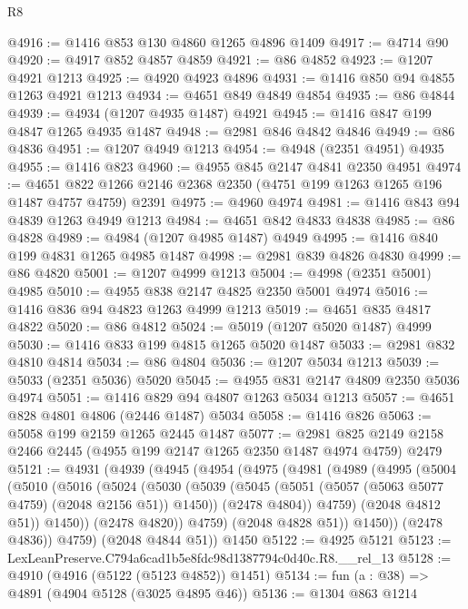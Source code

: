 \begin{lexlean}{R8}
\begin{coremodule}
@4916 := @1416 @853 @130 @4860 @1265 @4896 @1409
@4917 := @4714 @90
@4920 := @4917 @852 @4857 @4859
@4921 := @86 @4852
@4923 := @1207 @4921 @1213
@4925 := @4920 @4923 @4896
@4931 := @1416 @850 @94 @4855 @1263 @4921 @1213
@4934 := @4651 @849 @4849 @4854
@4935 := @86 @4844
@4939 := @4934 (@1207 @4935 @1487) @4921
@4945 := @1416 @847 @199 @4847 @1265 @4935 @1487
@4948 := @2981 @846 @4842 @4846
@4949 := @86 @4836
@4951 := @1207 @4949 @1213
@4954 := @4948 (@2351 @4951) @4935
@4955 := @1416 @823
@4960 := @4955 @845 @2147 @4841 @2350 @4951
@4974 := @4651 @822 @1266 @2146 @2368 @2350 (@4751 @199 @1263 @1265 @196 @1487 @4757 @4759) @2391
@4975 := @4960 @4974
@4981 := @1416 @843 @94 @4839 @1263 @4949 @1213
@4984 := @4651 @842 @4833 @4838
@4985 := @86 @4828
@4989 := @4984 (@1207 @4985 @1487) @4949
@4995 := @1416 @840 @199 @4831 @1265 @4985 @1487
@4998 := @2981 @839 @4826 @4830
@4999 := @86 @4820
@5001 := @1207 @4999 @1213
@5004 := @4998 (@2351 @5001) @4985
@5010 := @4955 @838 @2147 @4825 @2350 @5001 @4974
@5016 := @1416 @836 @94 @4823 @1263 @4999 @1213
@5019 := @4651 @835 @4817 @4822
@5020 := @86 @4812
@5024 := @5019 (@1207 @5020 @1487) @4999
@5030 := @1416 @833 @199 @4815 @1265 @5020 @1487
@5033 := @2981 @832 @4810 @4814
@5034 := @86 @4804
@5036 := @1207 @5034 @1213
@5039 := @5033 (@2351 @5036) @5020
@5045 := @4955 @831 @2147 @4809 @2350 @5036 @4974
@5051 := @1416 @829 @94 @4807 @1263 @5034 @1213
@5057 := @4651 @828 @4801 @4806 (@2446 @1487) @5034
@5058 := @1416 @826
@5063 := @5058 @199 @2159 @1265 @2445 @1487
@5077 := @2981 @825 @2149 @2158 @2466 @2445 (@4955 @199 @2147 @1265 @2350 @1487 @4974 @4759) @2479
@5121 := @4931
    (@4939
      (@4945
        (@4954
          (@4975
            (@4981
              (@4989
                (@4995
                  (@5004
                    (@5010
                      (@5016
                        (@5024
                          (@5030
                            (@5039
                              (@5045 (@5051 (@5057 (@5063 @5077 @4759) (@2048 @2156 @51)) @1450))
                              (@2478 @4804))
                            @4759)
                          (@2048 @4812 @51))
                        @1450))
                    (@2478 @4820))
                  @4759)
                (@2048 @4828 @51))
              @1450))
          (@2478 @4836))
        @4759)
      (@2048 @4844 @51))
    @1450
@5122 := @4925 @5121
@5123 := LexLeanPreserve.C794a6cad1b5e8fdc98d1387794c0d40c.R8.__rel_13
@5128 := @4910 (@4916 (@5122 (@5123 @4852)) @1451)
@5134 := fun (a : @38) => @4891 (@4904 @5128 (@3025 @4895 @46))
@5136 := @1304 @863 @1214

\end{coremodule}
\end{lexlean}
